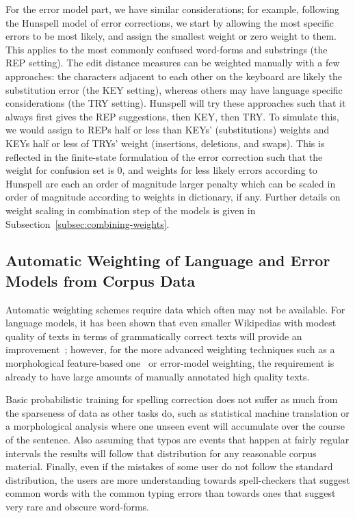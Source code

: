 \documentclass[a4paper,12pt]{article}
\begin{document}
For the error model part, we have similar considerations; for example,
following the Hunspell model of error corrections, we start by allowing the
most specific errors to be most likely, and assign the smallest weight or zero
weight to them. This applies to the most commonly confused word-forms and
substrings (the REP setting). The edit distance measures can be weighted
manually with a few approaches: the characters adjacent to each other on the
keyboard are likely the substitution error (the KEY setting), whereas others
may have language specific considerations (the TRY setting). Hunspell will try
these approaches such that it always first gives the REP suggestions, then KEY,
then TRY. To simulate this, we would assign to REPs half or less than KEYs'
(substitutions) weights and KEYs half or less of TRYs' weight (insertions,
deletions, and swaps). This is reflected in the finite-state formulation of the
error correction such that the weight for confusion set is 0, and weights for
less likely errors according to Hunspell are each an order of magnitude larger
penalty which can be scaled in order of magnitude according to weights in
dictionary, if any. Further details on weight scaling in combination step of
the models is given in Subsection~\ref{subsec:combining-weights}.

\subsection{Automatic Weighting of Language and Error Models from Corpus Data}
\label{subsec:automatic-weighting}

Automatic weighting schemes require data which often may not be available.
For language models, it has been shown that even smaller Wikipedias
with modest quality of texts in terms of grammatically correct texts will
provide an improvement~\cite[]{pirinen/2010/lrec}; however, for the more
advanced weighting techniques such as a morphological feature-based
one~\cite[]{pirinen2012improving} or error-model weighting, the requirement
is already to have large amounts of manually annotated high quality texts.

Basic probabilistic training for spelling correction does not suffer as much
from the sparseness of data as other tasks do, such as statistical machine
translation or a morphological analysis where one unseen event will
accumulate over the course of the sentence. Also assuming that typos are
events that happen at fairly regular intervals the results will follow that
distribution for any reasonable corpus material. Finally, even if the mistakes
of some user do not follow the standard distribution, the users are more
understanding towards spell-checkers that suggest common words with the
common typing errors than towards ones that suggest very rare and obscure
word-forms.
\end{document}
